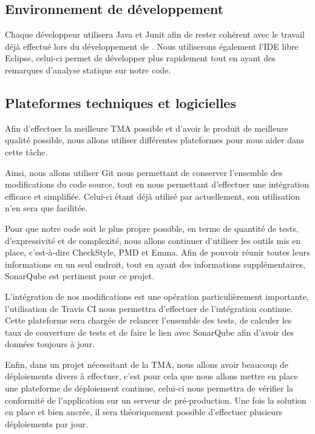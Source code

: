 	\subsection{Environnement de développement}
	Chaque développeur utilisera Java et Junit afin de rester cohérent avec le travail déjà effectué lors du développement de \correlyce{}. Nous utiliserons également l’IDE libre Eclipse, celui-ci permet de développer plus rapidement tout en ayant des remarques d’analyse statique sur notre code.
	
	\subsection{Plateformes techniques et logicielles}
	Afin d’effectuer la meilleure TMA possible et d’avoir le produit de meilleure qualité possible, nous allons utiliser différentes plateformes pour nous aider dans cette tâche. 
	
	Ainsi, nous allons utiliser Git nous permettant de conserver l’ensemble des modifications du code source, tout en nous permettant d’effectuer une intégration efficace et simplifiée.
	Celui-ci étant déjà utilisé par \correlyce{} actuellement, son utilisation n’en sera que facilitée.
	
	Pour que notre code soit le plus propre possible, en terme de quantité de tests, d’expressivité et de complexité, nous allons continuer d’utiliser les outils mis en place, c’est-à-dire CheckStyle, PMD et Emma. Afin de pouvoir réunir toutes leurs informations en un seul endroit, tout en ayant des informations supplémentaires, SonarQube est pertinent pour ce projet.
	
	L’intégration de nos modifications est une opération particulièrement importante, l’utilisation de Travis CI nous permettra d’effectuer de l’intégration continue. Cette plateforme sera chargée de relancer l’ensemble des tests, de calculer les taux de couverture de tests et de faire le lien avec SonarQube afin d’avoir des données toujours à jour.
	
	Enfin, dans un projet nécessitant de la TMA, nous allons avoir beaucoup de déploiements divers à effectuer, c’est pour cela que nous allons mettre en place une plateforme de déploiement continue, celui-ci nous permettra de vérifier la conformité de l’application sur un serveur de pré-production.
	Une fois la solution en place et bien ancrée, il sera théoriquement possible d’effectuer plusieurs déploiements par jour.
	
	